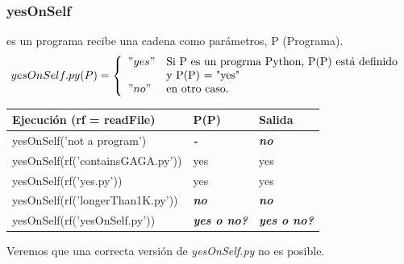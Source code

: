 \documentclass[xcolor=table]{beamer}
\begin{document}
\begin{frame}  \frametitle{yesOnSelf}  \scriptsize  

es un programa recibe una cadena como parámetros,  P (Programa). 
\begin{equation}
     \label{eq:yesOnSelf}
     yesOnSelf.py (P) =  \left\{
	       \begin{array}{ll}
		 "yes"      & \text{Si P es un progrma Python, P(P) está definido } \\
                     &   \text{y P(P) = "yes"} \\
		 "no"       & \text{en otro caso.} \\
	       \end{array}
	     \right.
   \end{equation}


    \begin{table}[]
    \begin{tabular}{|l|l|l|}
    \hline
    \rowcolor[HTML]{EFEFEF} 
    {\color[HTML]{000000} \textbf{Ejecución (rf = readFile)}} & {\color[HTML]{000000} \textbf{P(P)}}   & {\color[HTML]{000000} \textbf{Salida}}             \\ \hline\hline
    yesOnSelf('not a program')           & \color[HTML]{FE0000} \textit{\textbf{-}}             & \color[HTML]{FE0000} \textit{\textbf{no}}  \\ \hline\hline
    yesOnSelf(rf('containsGAGA.py'))     & yes        & yes \\ \hline\hline
    yesOnSelf(rf('yes.py'))                & yes           & yes \\ \hline\hline
    yesOnSelf(rf('longerThan1K.py')) & \color[HTML]{FE0000} \textit{\textbf{no}} & \color[HTML]{FE0000} \textit{\textbf{no}} \\ \hline\hline
    yesOnSelf(rf('yesOnSelf.py'))  & \color[HTML]{FE0000} \textit{\textbf{yes o no?}}  & \color[HTML]{FE0000} \textit{\textbf{yes o no?}}  \\ \hline
    \end{tabular}
\end{table}

\begin{center}

    Veremos que una correcta versión de \textit{yesOnSelf.py} no es posible.
\end{center}
\end{frame} 
\end{document}
